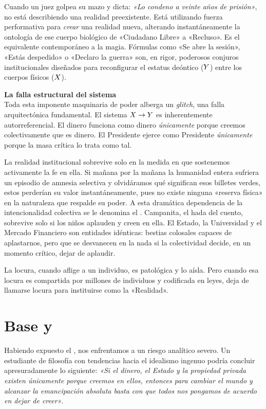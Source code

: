 Cuando un juez golpea su mazo y dicta: \textit{«Lo condeno a veinte años de prisión»}, no está describiendo una realidad preexistente. Está utilizando fuerza performativa para \textit{crear} una realidad nueva, alterando instantáneamente la ontología de ese cuerpo biológico de «Ciudadano Libre» a «Recluso». Es el equivalente contemporáneo a la magia. Fórmulas como «Se abre la sesión», «Estás despedido» o «Declaro la guerra» son, en rigor, poderosos conjuros institucionales diseñados para reconfigurar el estatus deóntico ($Y$) entre los cuerpos físicos ($X$).

\begin{problema}
\textbf{La falla estructural del sistema}\\
Toda esta imponente maquinaria de poder alberga un \textit{glitch}, una falla arquitectónica fundamental. El sistema $X \to Y$ es inherentemente autorreferencial. El dinero funciona como dinero \textit{únicamente} porque creemos colectivamente que es dinero. El Presidente ejerce como Presidente \textit{únicamente} porque la masa crítica lo trata como tal. 

La realidad institucional sobrevive solo en la medida en que sostenemos activamente la fe en ella. Si mañana por la mañana la humanidad entera sufriera un episodio de amnesia selectiva y olvidáramos qué significan esos billetes verdes, estos perderían su valor instantáneamente, pues no existe ninguna «reserva física» en la naturaleza que respalde su poder. A esta dramática dependencia de la intencionalidad colectiva se le denomina el \textbf{\EfectoTinkerbell}. Campanita, el hada del cuento, sobrevive solo si los niños aplauden y creen en ella. El Estado, la Universidad y el Mercado Financiero son entidades idénticas: bestias colosales capaces de aplastarnos, pero que se desvanecen en la nada si la colectividad decide, en un momento crítico, dejar de aplaudir.
\end{problema}

La locura, cuando aflige a un individuo, es patológica y lo aísla. Pero cuando esa locura es compartida por millones de individuos y codificada en leyes, deja de llamarse locura para instituirse como la «Realidad».

\section{Base y \Superestructura}

Habiendo expuesto el \EfectoTinkerbell, nos enfrentamos a un riesgo analítico severo. Un estudiante de filosofía con tendencias hacia el idealismo ingenuo podría concluir apresuradamente lo siguiente: \textit{«Si el dinero, el Estado y la propiedad privada existen únicamente porque creemos en ellos, entonces para cambiar el mundo y alcanzar la emancipación absoluta basta con que todos nos pongamos de acuerdo en dejar de creer»}. 


